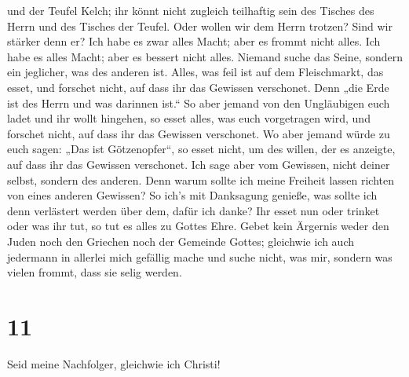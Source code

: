 und der Teufel Kelch; ihr könnt nicht zugleich teilhaftig sein des
Tisches des Herrn und des Tisches der Teufel.  Oder
wollen wir dem Herrn trotzen? Sind wir stärker denn er? 
Ich habe es zwar alles Macht; aber es frommt nicht alles. Ich habe es
alles Macht; aber es bessert nicht alles.  Niemand suche
das Seine, sondern ein jeglicher, was des anderen ist. 
Alles, was feil ist auf dem Fleischmarkt, das esset, und forschet nicht,
auf dass ihr das Gewissen verschonet.  Denn „die Erde ist
des Herrn und was darinnen ist.``  So aber jemand von den
Ungläubigen euch ladet und ihr wollt hingehen, so esset alles, was euch
vorgetragen wird, und forschet nicht, auf dass ihr das Gewissen
verschonet.  Wo aber jemand würde zu euch sagen: „Das ist
Götzenopfer``, so esset nicht, um des willen, der es anzeigte, auf dass
ihr das Gewissen verschonet.  Ich sage aber vom Gewissen,
nicht deiner selbst, sondern des anderen. Denn warum sollte ich meine
Freiheit lassen richten von eines anderen Gewissen?  So
ich's mit Danksagung genieße, was sollte ich denn verlästert werden über
dem, dafür ich danke?  Ihr esset nun oder trinket oder
was ihr tut, so tut es alles zu Gottes Ehre.  Gebet kein
Ärgernis weder den Juden noch den Griechen noch der Gemeinde Gottes;
 gleichwie ich auch jedermann in allerlei mich gefällig
mache und suche nicht, was mir, sondern was vielen frommt, dass sie
selig werden.

\hypertarget{section-10}{%
\section{11}\label{section-10}}

 Seid meine Nachfolger, gleichwie ich Christi!

